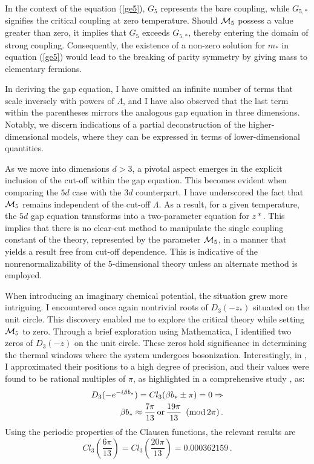 \documentclass[twoside]{article}
\begin{document}
In the context of the equation (\ref{ge5}), $G_5$ represents the bare coupling, while $G_{5,*}$ signifies the critical coupling at zero temperature. Should ${\cal M}_5$ possess a value greater than zero, it implies that $G_5$ exceeds $G_{5,*}$, thereby entering the domain of strong coupling. Consequently, the existence of a non-zero solution for $m_*$ in equation (\ref{ge5}) would lead to the breaking of parity symmetry by giving mass to elementary fermions.

In deriving the gap equation, I have omitted an infinite number of terms that scale inversely with powers of $\Lambda$, and I have also observed that the last term within the parentheses mirrors the analogous gap equation in three dimensions. Notably, we discern indications of a partial deconstruction of the higher-dimensional models, where they can be expressed in terms of lower-dimensional quantities.

As we move into dimensions $d>3$, a pivotal aspect emerges in the explicit inclusion of the cut-off within the gap equation. This becomes evident when comparing the $5d$ case with the $3d$ counterpart. I have underscored the fact that ${\cal M}_5$ remains independent of the cut-off $\Lambda$. As a result, for a given temperature, the $5d$ gap equation transforms into a two-parameter equation for $z*$. This implies that there is no clear-cut method to manipulate the single coupling constant of the theory, represented by the parameter ${\cal M}_5$, in a manner that yields a result free from cut-off dependence. This is indicative of the nonrenormalizability of the 5-dimensional theory unless an alternate method is employed.



When introducing an imaginary chemical potential, the situation grew more intriguing. I encountered once again nontrivial roots of $D_3(-z_*)$ situated on the unit circle. This discovery enabled me to explore the critical theory while setting ${\cal M}_5$ to zero. Through a brief exploration using Mathematica, I identified two zeros of $D_3(-z)$ on the unit circle. These zeros hold significance in determining the thermal windows where the system undergoes bosonization. Interestingly, in \cite{Filothodoros:2018}, I approximated their positions to a high degree of precision, and their values were found to be rational multiples of $\pi$, as highlighted in a comprehensive study \cite{Etienne}, as:
\begin{align}
\nonumber D_3(-e^{-i\beta b_*})=Cl_3(\beta b_*\pm\pi)=0\Rightarrow\\ \beta b_*\approx \frac{7\pi}{13}\,{\rm or}\,\frac{19\pi}{13} \,\,\,({\rm mod}\,2\pi)\,.
\end{align}
Using the periodic properties of the Clausen functions, the relevant results are 
\begin{equation}
Cl_3\left(\frac{6\pi}{13}\right)=Cl_3\left(\frac{20\pi}{13}\right)=0.000362159\,.
\end{equation}
\end{document}
